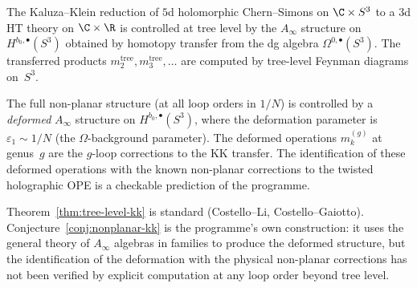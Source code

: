 \begin{theorem}
\label{thm:tree-level-kk}
The Kaluza--Klein reduction of $5$d holomorphic Chern--Simons on
$\C \times S^3$ to a $3$d HT theory on $\C \times \R$ is
controlled at tree level by the $A_\infty$ structure on
$H^{b_0, \bullet}(S^3)$ obtained by homotopy transfer from the dg
algebra $\Omega^{0,\bullet}(S^3)$. The transferred products
$m_2^{\mathrm{tree}}, m_3^{\mathrm{tree}}, \ldots$ are computed by
tree-level Feynman diagrams on~$S^3$.
\end{theorem}

\begin{conjecture}
\label{conj:nonplanar-kk}
The full non-planar structure \textup{(}at all loop orders in
$1/N$\textup{)} is controlled by a \emph{deformed} $A_\infty$
structure on $H^{b_0, \bullet}(S^3)$, where the deformation
parameter is $\varepsilon_1 \sim 1/N$
\textup{(}the $\Omega$-background parameter\textup{)}. The
deformed operations $m_k^{(g)}$ at genus~$g$ are the $g$-loop
corrections to the KK transfer. The identification of these
deformed operations with the known non-planar corrections to the
twisted holographic OPE is a checkable prediction of the
programme.
\end{conjecture}

\begin{remark}[Scope]
\label{rem:kk-transfer-scope}
Theorem~\ref{thm:tree-level-kk} is standard
\textup{(}Costello--Li, Costello--Gaiotto\textup{)}.
Conjecture~\ref{conj:nonplanar-kk} is the programme's own
construction: it uses the general theory of $A_\infty$ algebras
in families to produce the deformed structure, but the
identification of the deformation with the physical non-planar
corrections has not been verified by explicit computation at any
loop order beyond tree level.
\end{remark}
